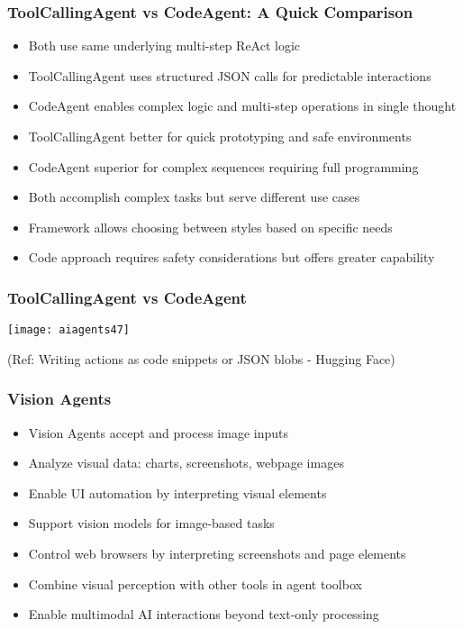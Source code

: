\begin{frame}[fragile]\frametitle{ToolCallingAgent vs CodeAgent: A Quick Comparison}
      \begin{itemize}
	\item Both use same underlying multi-step ReAct logic
	\item ToolCallingAgent uses structured JSON calls for predictable interactions
	\item CodeAgent enables complex logic and multi-step operations in single thought
	\item ToolCallingAgent better for quick prototyping and safe environments
	\item CodeAgent superior for complex sequences requiring full programming
	\item Both accomplish complex tasks but serve different use cases
	\item Framework allows choosing between styles based on specific needs
	\item Code approach requires safety considerations but offers greater capability
	  \end{itemize}
\end{frame}

\begin{frame}[fragile]\frametitle{ToolCallingAgent vs CodeAgent}
	
	\begin{center}
	\texttt{[image: aiagents47]}
	
	{\tiny (Ref: Writing actions as code snippets or JSON blobs - Hugging Face)}
	\end{center}
	
\end{frame}

\begin{frame}[fragile]\frametitle{Vision Agents}
      \begin{itemize}
	\item Vision Agents accept and process image inputs
	\item Analyze visual data: charts, screenshots, webpage images
	\item Enable UI automation by interpreting visual elements
	\item Support vision models for image-based tasks
	\item Control web browsers by interpreting screenshots and page elements
	\item Combine visual perception with other tools in agent toolbox
	\item Enable multimodal AI interactions beyond text-only processing
	  \end{itemize}
\end{frame}

